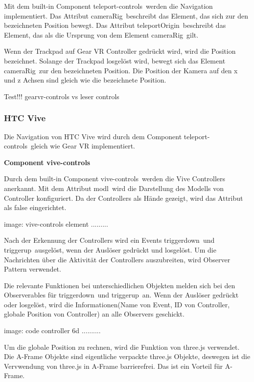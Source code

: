   Mit dem built-in Component \glqq teleport-controls\grqq\ werden die Navigation implementiert. Das Attribut \glqq cameraRig\grqq\ beschreibt das Element, das sich zur den bezeichneten Position bewegt. Das Attribut \glqq teleportOrigin\grqq\ beschreibt das Element, das als die Ursprung von dem Element \glqq cameraRig\grqq\ gilt.
  
  Wenn der Trackpad auf Gear VR Controller gedrückt wird, wird die Position bezeichnet. Solange der Trackpad losgelöst wird, bewegt sich das Element \glqq cameraRig\grqq\ zur den bezeichneten Position. Die Position der Kamera auf den x und z Achsen sind gleich wie die bezeichnete Position. 
  
  Test!!! gearvr-controls vs leser controls
  
  \subsubsection{HTC Vive}
  
  Die Navigation von HTC Vive wird durch dem Component \glqq teleport-controls\grqq\ gleich wie Gear VR implementiert.
  
  \textbf{Component vive-controls}
  
  Durch dem built-in Component \glqq vive-controls\grqq\ werden die Vive Controllers anerkannt. Mit dem Attribut \glqq modl\grqq\ wird die Darstellung des Modells von Controller konfiguriert. Da der Controllers als Hände gezeigt, wird das Attribut als false eingerichtet.
  
  image: vive-controls element .........
  
  Nach der Erkennung der Controllers wird ein Events \glqq triggerdown\grqq\ und \glqq triggerup\grqq\ ausgelöst, wenn der Auslöser gedrückt und losgelöst. Um die Nachrichten über die Aktivität der Controllers auszubreiten, wird Observer Pattern verwendet.
  
  Die relevante Funktionen bei unterschiedlichen Objekten melden sich bei den Observerables für \glqq triggerdown\grqq\ und \glqq triggerup\grqq\ an. Wenn der Auslöser gedrückt oder losgelöst, wird die Informationen(Name von Event, ID von Controller, globale Position von Controller) an alle Observers geschickt.
  
  image: code controller 6d ..........
  
  Um die globale Position zu rechnen, wird die Funktion von three.js verwendet. Die A-Frame Objekte sind eigentliche verpackte three.js Objekte, deswegen ist die Vervwendung von three.js in A-Frame barrierefrei. Das ist ein Vorteil für A-Frame.
  
